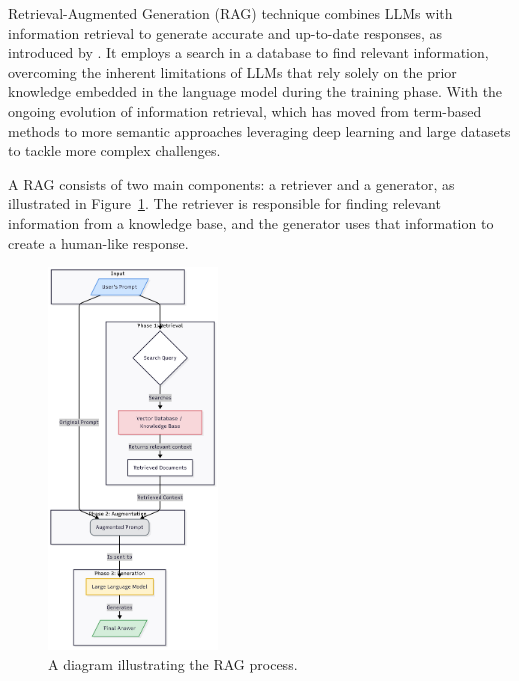            Retrieval-Augmented Generation (RAG) technique combines LLMs with information retrieval to generate accurate and up-to-date responses, as introduced by \citet{Lewis2020}. 
            It employs a search in a database to find relevant information, overcoming the inherent limitations of LLMs that rely solely on the prior knowledge embedded in the language model during the training phase. 
            With the ongoing evolution of information retrieval, which has moved from term-based methods to more semantic approaches leveraging deep learning and large datasets to tackle more complex challenges.
            
            A RAG consists of two main components: a retriever and a generator, as illustrated in Figure~\ref{fig:rag_diagram}. The retriever is responsible for finding relevant information from a knowledge base, and the generator uses that information to create a human-like response. 
            
            \begin{figure}[h!]
                \centering
                \includegraphics[width=0.4\textwidth]{images/rag_diagram_vertical.png}
                \caption{A diagram illustrating the RAG process.}
                \label{fig:rag_diagram}
            \end{figure}         

